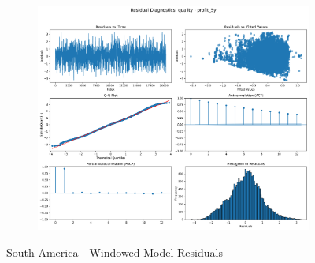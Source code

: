\documentclass[11pt,english,a4paper,hidelinks]{book}
\begin{document}
\begin{figure}[H]
\begin{subfigure}[b]{0.32\textwidth}
    \end{subfigure}
    \hfill
    \begin{subfigure}[b]{0.32\textwidth}
        \centering
        \includegraphics[width=\textwidth]{images/code/models/linear_regression/third_model/LAT/quality_profit_5y_residuals.png}
    \end{subfigure}
    \caption{South America - Windowed Model Residuals}
    \label{fig:linear_regression_LAT_residues_windowed}
\end{figure}

\end{document}
